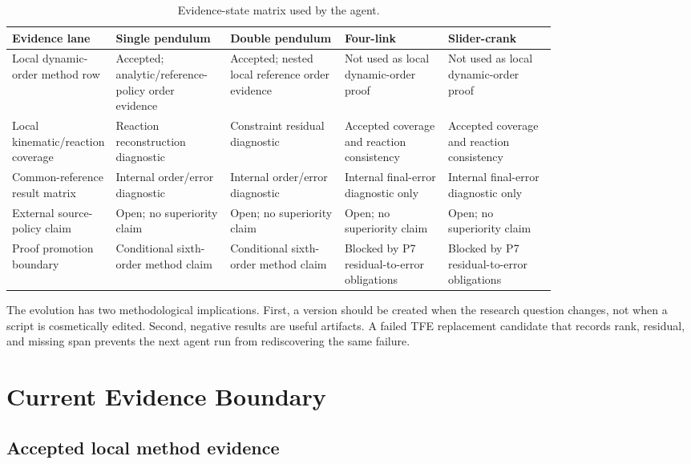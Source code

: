 \documentclass[10pt]{article}
\begin{document}
\begin{table}[H]
\centering
\caption{Evidence-state matrix used by the agent.}
\label{tab:evidence_state_matrix}
\small
\begin{tabularx}{\linewidth}{p{0.18\linewidth}p{0.21\linewidth}p{0.21\linewidth}p{0.19\linewidth}Y}
\toprule
\textbf{Evidence lane} & \textbf{Single pendulum} & \textbf{Double pendulum} & \textbf{Four-link} & \textbf{Slider-crank} \\
\midrule
Local dynamic-order method row & Accepted; analytic/reference-policy order evidence & Accepted; nested local reference order evidence & Not used as local dynamic-order proof & Not used as local dynamic-order proof \\
Local kinematic/reaction coverage & Reaction reconstruction diagnostic & Constraint residual diagnostic & Accepted coverage and reaction consistency & Accepted coverage and reaction consistency \\
Common-reference result matrix & Internal order/error diagnostic & Internal order/error diagnostic & Internal final-error diagnostic only & Internal final-error diagnostic only \\
External source-policy claim & Open; no superiority claim & Open; no superiority claim & Open; no superiority claim & Open; no superiority claim \\
Proof promotion boundary & Conditional sixth-order method claim & Conditional sixth-order method claim & Blocked by P7 residual-to-error obligations & Blocked by P7 residual-to-error obligations \\
\bottomrule
\end{tabularx}
\end{table}

The evolution has two methodological implications. First, a version should be
created when the research question changes, not when a script is cosmetically
edited. Second, negative results are useful artifacts. A failed TFE replacement
candidate that records rank, residual, and missing span prevents the next agent
run from rediscovering the same failure.

\section{Current Evidence Boundary}

\subsection{Accepted local method evidence}
\end{document}
